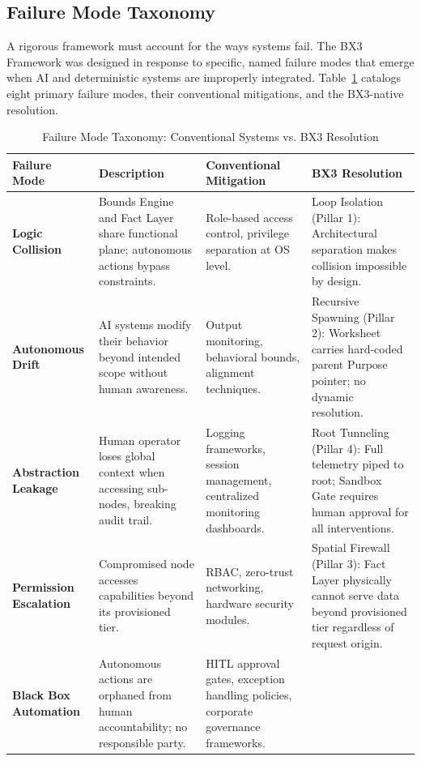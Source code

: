 \documentclass[12pt]{article}
\theoremstyle{plain}
\begin{document}
\subsection{Failure Mode Taxonomy}

A rigorous framework must account for the ways systems fail. The BX3 Framework was designed in response to specific, named failure modes that emerge when AI and deterministic systems are improperly integrated. Table~\ref{tab:failure-modes} catalogs eight primary failure modes, their conventional mitigations, and the BX3-native resolution.

\begin{table}[htbp]
\caption{Failure Mode Taxonomy: Conventional Systems vs. BX3 Resolution}
\label{tab:failure-modes}
\begin{center}
\begin{tabular}{>{\bfseries}p{2.4cm} p{3.2cm} p{3.2cm} p{3.2cm}}
\toprule
\textbf{Failure Mode} & \textbf{Description} & \textbf{Conventional Mitigation} & \textbf{BX3 Resolution} \\
\midrule
Logic Collision & Bounds Engine and Fact Layer share functional plane; autonomous actions bypass constraints. &
Role-based access control, privilege separation at OS level. &
Loop Isolation (Pillar 1): Architectural separation makes collision impossible by design. \\
\addlinespace
Autonomous Drift & AI systems modify their behavior beyond intended scope without human awareness. &
Output monitoring, behavioral bounds, alignment techniques. &
Recursive Spawning (Pillar 2): Worksheet carries hard-coded parent Purpose pointer; no dynamic resolution. \\
\addlinespace
Abstraction Leakage & Human operator loses global context when accessing sub-nodes, breaking audit trail. &
Logging frameworks, session management, centralized monitoring dashboards. &
Root Tunneling (Pillar 4): Full telemetry piped to root; Sandbox Gate requires human approval for all interventions. \\
\addlinespace
Permission Escalation & Compromised node accesses capabilities beyond its provisioned tier. &
RBAC, zero-trust networking, hardware security modules. &
Spatial Firewall (Pillar 3): Fact Layer physically cannot serve data beyond provisioned tier regardless of request origin. \\
\addlinespace
Black Box Automation & Autonomous actions are orphaned from human accountability; no responsible party. &
HITL approval gates, exception handling policies, corporate governance frameworks. &

\end{tabular}
\end{center}
\end{table}
\end{document}
